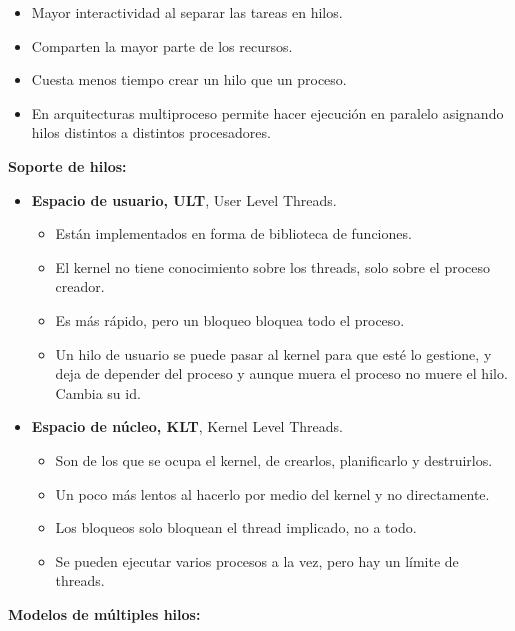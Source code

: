 \documentclass[12pt, twoside, openright]{report} %
\begin{document}
  \begin{itemize}
  \item Mayor interactividad al separar las tareas en hilos.
    
  \item Comparten la mayor parte de los recursos.
    
  \item Cuesta menos tiempo crear un hilo que un proceso.
    
  \item En arquitecturas multiproceso permite hacer ejecución en paralelo
    asignando hilos distintos a distintos procesadores.
    
  \end{itemize}
\textbf{Soporte de hilos:}
  

  \begin{itemize}
  \item \textbf{Espacio de usuario, ULT}, User Level Threads.
    

    \begin{itemize}
    \item Están implementados en forma de biblioteca de funciones.
      
    \item El kernel no tiene conocimiento sobre los threads, solo sobre el
      proceso creador.
      
    \item Es más rápido, pero un bloqueo bloquea todo el proceso.
      
    \item Un hilo de usuario se puede pasar al kernel para que esté lo
      gestione, y deja de depender del proceso y aunque muera el proceso
      no muere el hilo. Cambia su id.
      
    \end{itemize}
  \item \textbf{Espacio de núcleo, KLT}, Kernel Level Threads.
    

    \begin{itemize}
    \item Son de los que se ocupa el kernel, de crearlos, planificarlo y
      destruirlos.
      
    \item Un poco más lentos al hacerlo por medio del kernel y no
      directamente.
      
    \item Los bloqueos solo bloquean el thread implicado, no a todo.
      
    \item Se pueden ejecutar varios procesos a la vez, pero hay un límite de
      threads.
      
    \end{itemize}
  \end{itemize}
\textbf{Modelos de múltiples hilos:}
  
\end{document}
